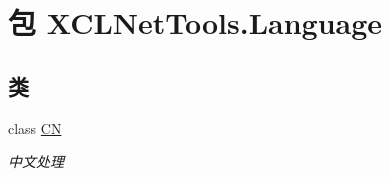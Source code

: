 \hypertarget{namespace_x_c_l_net_tools_1_1_language}{\section{包 X\-C\-L\-Net\-Tools.\-Language}
\label{namespace_x_c_l_net_tools_1_1_language}
}
\subsection*{类}
\begin{DoxyCompactItemize}
\item 
class \hyperlink{class_x_c_l_net_tools_1_1_language_1_1_c_n}{C\-N}
\begin{DoxyCompactList}\small\item\em 中文处理 \end{DoxyCompactList}\end{DoxyCompactItemize}
